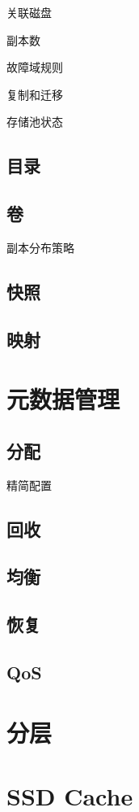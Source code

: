 关联磁盘

副本数

故障域规则

复制和迁移

存储池状态

\subsection{目录}

\subsection{卷}

副本分布策略

\subsection{快照}

\subsection{映射}

\section{元数据管理}

\subsection{分配}

精简配置

\subsection{回收}

\subsection{均衡}

\subsection{恢复}

\subsection{QoS}

\section{分层}

\section{SSD Cache}
